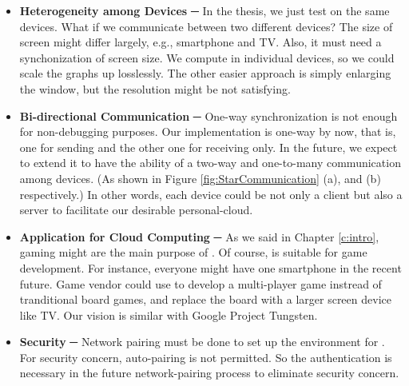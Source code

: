 \begin{itemize}
\item \textbf{Heterogeneity among Devices} ─{} In the thesis, we just test \Fountain{} on the same devices. What if we communicate between two different devices? The size of screen might differ largely, e.g., smartphone and TV. Also, it must need a synchonization of screen size. We compute in individual devices, so we could scale the graphs up losslessly. The other easier approach is simply enlarging the window, but the resolution might be not satisfying. 
\item \textbf{Bi-directional Communication} ─{} One-way synchronization is not enough for non-debugging purposes. Our implementation is one-way by now, that is, one for sending and the other one for receiving only. In the future, we expect to extend it to have the ability of a two-way and one-to-many communication among devices. (As shown in Figure \ref{fig:StarCommunication} (a), and (b) respectively.) In other words, each device could be not only a client but also a server to facilitate our desirable personal-cloud.
\item \textbf{Application for Cloud Computing} ─{} As we said in Chapter \ref{c:intro}, gaming might are the main purpose of \RS{}. Of course, \RRS{} is suitable for game development. For instance, everyone might have one smartphone in the recent future. Game vendor could use \RRS{} to develop a multi-player game instread of tranditional board games, and replace the board with a larger screen device like TV. Our vision is similar with Google Project Tungsten.
\item \textbf{Security} ─{} Network pairing must be done to set up the environment for \RRS{}. For security concern, auto-pairing is not permitted. So the authentication is necessary in the future network-pairing process to eliminate security concern.
\end{itemize}


